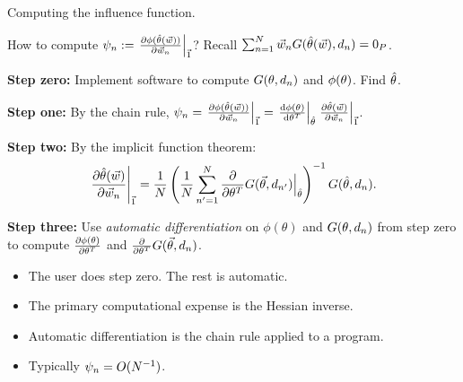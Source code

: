 \begin{frame}{Computing the influence function.}

How to compute
$\psi_n := \left.\frac{\partial \phi(\hat{\theta}(\vec{w}))}{\partial \vec{w}_n}\right|_{\vec{1}}$?
%
Recall $\sum_{n=1}^N \vec{w}_{n} G(\hat{\theta}(\vec{w}), d_{n}) =  0_{P}$.

\textbf{Step zero:}
Implement software to compute $G(\theta, d_{n})$ and
$\phi(\theta)$. Find $\hat{\theta}$.

\textbf{Step one:}
By the chain rule,
$\psi_n = \left.\frac{\partial \phi(\hat{\theta}(\vec{w}))}{\partial \vec{w}_n}\right|_{\vec{1}}
= \left.\frac{\mathrm{d} \phi(\theta)}{\mathrm{d} \theta^T}\right|_{\hat{\theta}}
  \left.\frac{\partial \hat{\theta}(\vec{w})}{\partial \vec{w}_n}\right|_{\vec{1}}$.

\textbf{Step two:}
By the implicit function theorem:
%
\begin{align*}
%
\fracat{\partial \thetahat(\w)}{\partial \w_n}{\onevec} ={}
\frac{1}{N}
\left(
  \frac{1}{N}
  \sum_{n'=1}^N
    \frac{\partial}{\partial \theta^T} G(\vec\theta, \d_{n'})
        \Big\vert_{\thetahat}
\right)^{-1} G(\thetahat, \d_{n}).
%
\end{align*}
%

\textbf{Step three:}
%
Use \textit{automatic differentiation} on $\phi(\theta)$ and $G(\theta, d_{n})$
from step zero to compute $\frac{\partial \phi(\theta)}{\partial \theta^T}$
and $\frac{\partial}{\partial \theta^T} G(\vec\theta, d_{n})$.

\hrulefill

\begin{itemize}
    \item The user does step zero.  The rest is automatic.
    \item The primary computational expense is the Hessian inverse.
    \item Automatic differentiation is the chain rule applied to a program.
    \item Typically $\psi_n = O(N^{-1})$.
\end{itemize}



%
%


\end{frame}
